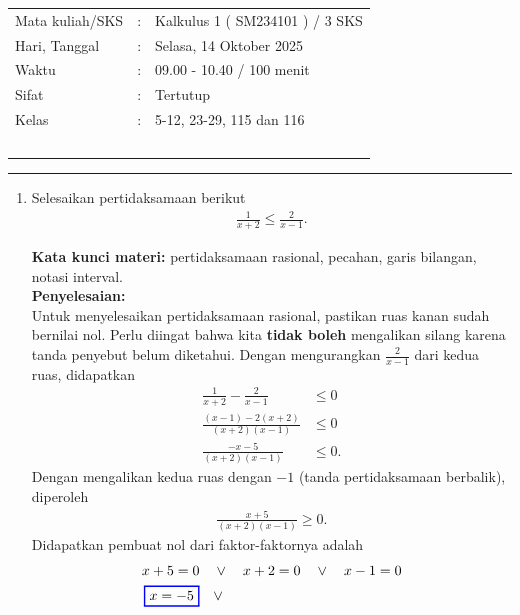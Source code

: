 \documentclass[10pt,openany,a4paper]{article}
\theoremstyle{definition}
\theoremstyle{definition}
\theoremstyle{plain}
\newenvironment{jawab}[2][tes]{%
\par\noindent\textbf{Kata kunci materi:} #1.\\
\textbf{Penyelesaian:} #2%
}{}
\begin{document}
    \begin{center}
	\begin{tabular}{lcl}
		Mata kuliah/SKS & : & Kalkulus 1 ( SM234101 ) / 3 SKS\\
		Hari, Tanggal & : & Selasa, 14 Oktober 2025\\
		Waktu & : & 09.00 - 10.40 / 100 menit\\
		Sifat & : & Tertutup\\
		Kelas & : & 5-12, 23-29, 115 dan 116\\
  ~
	\end{tabular}

    \noindent\rule{\textwidth}{2.pt}
        \end{center}
        \begin{enumerate}
            \item Selesaikan pertidaksamaan berikut
            \begin{align*}
                \frac{1}{x+2} \leq \frac{2}{x-1}.
            \end{align*}
            \begin{jawab}[pertidaksamaan rasional, pecahan, garis bilangan, notasi interval]{~\\
                Untuk menyelesaikan pertidaksamaan rasional, pastikan ruas kanan sudah bernilai nol. Perlu diingat bahwa kita \textbf{tidak boleh} mengalikan silang karena tanda penyebut belum diketahui. Dengan mengurangkan \(\frac{2}{x-1}\) dari kedua ruas, didapatkan
                \begin{align*}
                    \frac{1}{x+2} - \frac{2}{x-1} &\leq 0\\
                    \frac{(x-1) - 2(x+2)}{(x+2)(x-1)} &\leq 0\\
                    \frac{-x-5}{(x+2)(x-1)} &\leq 0.
                \end{align*}
                Dengan mengalikan kedua ruas dengan $-1$ (tanda pertidaksamaan berbalik), diperoleh
                \begin{align}
                    \frac{x+5}{(x+2)(x-1)} \geq 0. \label{ineq:soal7}
                \end{align}
                Didapatkan pembuat nol dari faktor-faktornya adalah
                \begin{align*}
                    x+5 = 0 \quad &\vee\quad x+2 = 0 \quad \vee\quad x-1=0\\
                    \colorlet{oldcolor}{.}
        \color{blue}
        \setlength{\fboxrule}{1pt} \boxed{\color{oldcolor}x=-5}\color{oldcolor} \quad &\vee\quad \colorlet{oldcolor}{.}

\end{align*}}
\end{jawab}
\end{enumerate}
\end{document}
